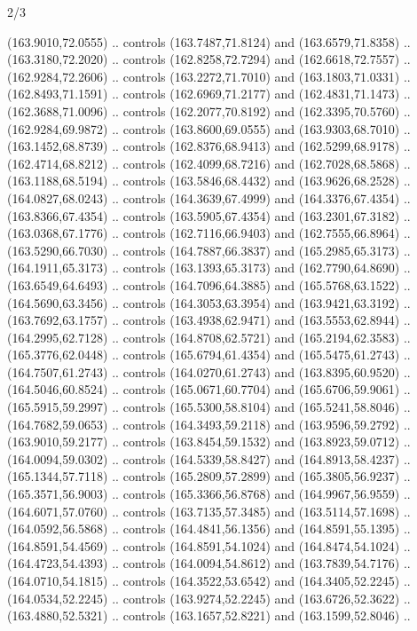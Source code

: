 \begin{flagdescription}{2/3}
\begin{scope}[xshift=0.5\flaglength,yshift=0.5\flagwidth,scale=\flagwidth/180]
\begin{scope}[y=0.8pt, x=0.8pt, yscale=-1,shift={(-168.75,-108.75)}]
  (163.9010,72.0555) .. controls (163.7487,71.8124) and (163.6579,71.8358) ..
  (163.3180,72.2020) .. controls (162.8258,72.7294) and (162.6618,72.7557) ..
  (162.9284,72.2606) .. controls (163.2272,71.7010) and (163.1803,71.0331) ..
  (162.8493,71.1591) .. controls (162.6969,71.2177) and (162.4831,71.1473) ..
  (162.3688,71.0096) .. controls (162.2077,70.8192) and (162.3395,70.5760) ..
  (162.9284,69.9872) .. controls (163.8600,69.0555) and (163.9303,68.7010) ..
  (163.1452,68.8739) .. controls (162.8376,68.9413) and (162.5299,68.9178) ..
  (162.4714,68.8212) .. controls (162.4099,68.7216) and (162.7028,68.5868) ..
  (163.1188,68.5194) .. controls (163.5846,68.4432) and (163.9626,68.2528) ..
  (164.0827,68.0243) .. controls (164.3639,67.4999) and (164.3376,67.4354) ..
  (163.8366,67.4354) .. controls (163.5905,67.4354) and (163.2301,67.3182) ..
  (163.0368,67.1776) .. controls (162.7116,66.9403) and (162.7555,66.8964) ..
  (163.5290,66.7030) .. controls (164.7887,66.3837) and (165.2985,65.3173) ..
  (164.1911,65.3173) .. controls (163.1393,65.3173) and (162.7790,64.8690) ..
  (163.6549,64.6493) .. controls (164.7096,64.3885) and (165.5768,63.1522) ..
  (164.5690,63.3456) .. controls (164.3053,63.3954) and (163.9421,63.3192) ..
  (163.7692,63.1757) .. controls (163.4938,62.9471) and (163.5553,62.8944) ..
  (164.2995,62.7128) .. controls (164.8708,62.5721) and (165.2194,62.3583) ..
  (165.3776,62.0448) .. controls (165.6794,61.4354) and (165.5475,61.2743) ..
  (164.7507,61.2743) .. controls (164.0270,61.2743) and (163.8395,60.9520) ..
  (164.5046,60.8524) .. controls (165.0671,60.7704) and (165.6706,59.9061) ..
  (165.5915,59.2997) .. controls (165.5300,58.8104) and (165.5241,58.8046) ..
  (164.7682,59.0653) .. controls (164.3493,59.2118) and (163.9596,59.2792) ..
  (163.9010,59.2177) .. controls (163.8454,59.1532) and (163.8923,59.0712) ..
  (164.0094,59.0302) .. controls (164.5339,58.8427) and (164.8913,58.4237) ..
  (165.1344,57.7118) .. controls (165.2809,57.2899) and (165.3805,56.9237) ..
  (165.3571,56.9003) .. controls (165.3366,56.8768) and (164.9967,56.9559) ..
  (164.6071,57.0760) .. controls (163.7135,57.3485) and (163.5114,57.1698) ..
  (164.0592,56.5868) .. controls (164.4841,56.1356) and (164.8591,55.1395) ..
  (164.8591,54.4569) .. controls (164.8591,54.1024) and (164.8474,54.1024) ..
  (164.4723,54.4393) .. controls (164.0094,54.8612) and (163.7839,54.7176) ..
  (164.0710,54.1815) .. controls (164.3522,53.6542) and (164.3405,52.2245) ..
  (164.0534,52.2245) .. controls (163.9274,52.2245) and (163.6726,52.3622) ..
  (163.4880,52.5321) .. controls (163.1657,52.8221) and (163.1599,52.8046) ..

\end{scope}
\end{scope}
\end{flagdescription}
